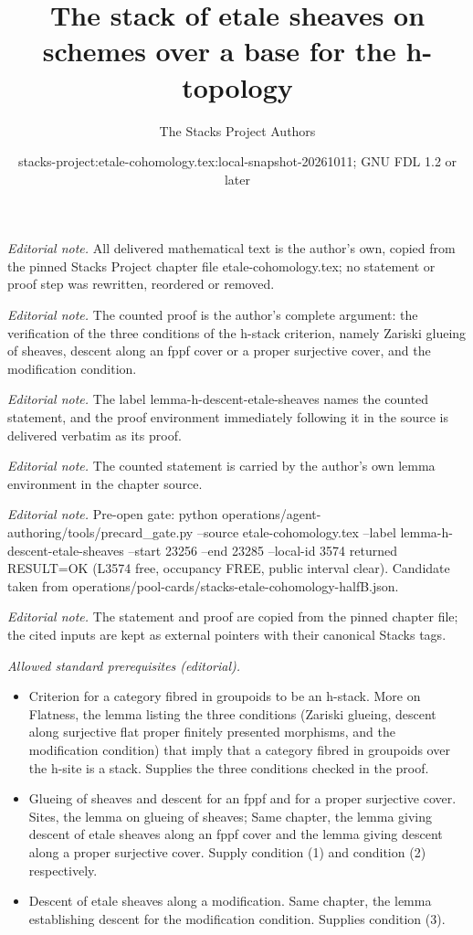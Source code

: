 \documentclass[10pt,a4paper]{amsart}
\title{The stack of etale sheaves on schemes over a base for the h-topology}
\author{The Stacks Project Authors}
\date{stacks-project:etale-cohomology.tex:local-snapshot-20261011; GNU FDL 1.2 or later}
\theoremstyle{plain}
\theoremstyle{definition}
\theoremstyle{remark}
\numberwithin{equation}{subsection}
\begin{document}
\maketitle
\noindent\textit{Editorial note.} All delivered mathematical text is the author's own, copied from the pinned Stacks Project chapter file etale-cohomology.tex; no statement or proof step was rewritten, reordered or removed.\par\medskip
\noindent\textit{Editorial note.} The counted proof is the author's complete argument: the verification of the three conditions of the h-stack criterion, namely Zariski glueing of sheaves, descent along an fppf cover or a proper surjective cover, and the modification condition.\par\medskip
\noindent\textit{Editorial note.} The label lemma-h-descent-etale-sheaves names the counted statement, and the proof environment immediately following it in the source is delivered verbatim as its proof.\par\medskip
\noindent\textit{Editorial note.} The counted statement is carried by the author's own lemma environment in the chapter source.\par\medskip
\noindent\textit{Editorial note.} Pre-open gate: python operations/agent-authoring/tools/precard\_gate.py --source etale-cohomology.tex --label lemma-h-descent-etale-sheaves --start 23256 --end 23285 --local-id 3574 returned RESULT=OK (L3574 free, occupancy FREE, public interval clear). Candidate taken from operations/pool-cards/stacks-etale-cohomology-halfB.json.\par\medskip
\noindent\textit{Editorial note.} The statement and proof are copied from the pinned chapter file; the cited inputs are kept as external pointers with their canonical Stacks tags.\par\medskip
\noindent\textit{Allowed standard prerequisites (editorial).}\begin{itemize}
\item Criterion for a category fibred in groupoids to be an h-stack. More on Flatness, the lemma listing the three conditions (Zariski glueing, descent along surjective flat proper finitely presented morphisms, and the modification condition) that imply that a category fibred in groupoids over the h-site is a stack. Supplies the three conditions checked in the proof.
\item Glueing of sheaves and descent for an fppf and for a proper surjective cover. Sites, the lemma on glueing of sheaves; Same chapter, the lemma giving descent of etale sheaves along an fppf cover and the lemma giving descent along a proper surjective cover. Supply condition (1) and condition (2) respectively.
\item Descent of etale sheaves along a modification. Same chapter, the lemma establishing descent for the modification condition. Supplies condition (3).
\end{itemize}\medskip
\end{document}
